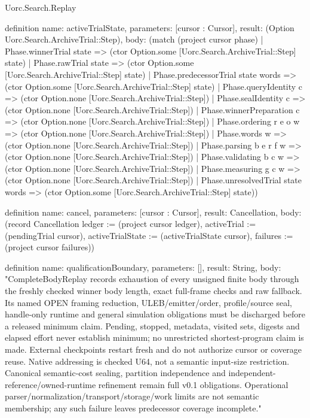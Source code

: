 \begin{lexlean}{Uorc.Search.Replay}
\begin{semanticmodule}
definition{
  name: activeTrialState,
  parameters: [cursor : Cursor],
  result: (Option Uorc.Search.ArchiveTrial::Step),
  body: (match (project cursor phase)
    | Phase.winnerTrial state => (ctor Option.some [Uorc.Search.ArchiveTrial::Step] state)
    | Phase.rawTrial state => (ctor Option.some [Uorc.Search.ArchiveTrial::Step] state)
    | Phase.predecessorTrial state words => (ctor Option.some [Uorc.Search.ArchiveTrial::Step] state)
    | Phase.queryIdentity c => (ctor Option.none [Uorc.Search.ArchiveTrial::Step])
    | Phase.sealIdentity c => (ctor Option.none [Uorc.Search.ArchiveTrial::Step])
    | Phase.winnerPreparation c => (ctor Option.none [Uorc.Search.ArchiveTrial::Step])
    | Phase.ordering r e o w => (ctor Option.none [Uorc.Search.ArchiveTrial::Step])
    | Phase.words w => (ctor Option.none [Uorc.Search.ArchiveTrial::Step])
    | Phase.parsing b e r f w => (ctor Option.none [Uorc.Search.ArchiveTrial::Step])
    | Phase.validating b c w => (ctor Option.none [Uorc.Search.ArchiveTrial::Step])
    | Phase.measuring g c w => (ctor Option.none [Uorc.Search.ArchiveTrial::Step])
    | Phase.unresolvedTrial state words => (ctor Option.some [Uorc.Search.ArchiveTrial::Step] state))
}

definition{
  name: cancel,
  parameters: [cursor : Cursor],
  result: Cancellation,
  body: (record Cancellation {ledger := (project cursor ledger), activeTrial := (pendingTrial cursor), activeTrialState := (activeTrialState cursor), failures := (project cursor failures)})
}

definition{
  name: qualificationBoundary,
  parameters: [],
  result: String,
  body: "CompleteBodyReplay records exhaustion of every unsigned finite body through the freshly checked winner body length, exact full-frame checks and raw fallback. Its named OPEN framing reduction, ULEB/emitter/order, profile/source seal, handle-only runtime and general simulation obligations must be discharged before a released minimum claim. Pending, stopped, metadata, visited sets, digests and elapsed effort never establish minimum; no unrestricted shortest-program claim is made. External checkpoints restart fresh and do not authorize cursor or coverage reuse. Native addressing is checked U64, not a semantic input-size restriction. Canonical semantic-cost sealing, partition independence and independent-reference/owned-runtime refinement remain full v0.1 obligations. Operational parser/normalization/transport/storage/work limits are not semantic membership; any such failure leaves predecessor coverage incomplete."
}


\end{semanticmodule}
\end{lexlean}
